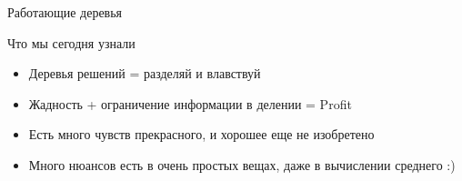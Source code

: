 \documentclass[14pt, fleqn, xcolor={dvipsnames, table}]{beamer}
\begin{document}
\begin{frame}{Работающие деревья}
\large
\center
{}
\end{frame}


\begin{frame}{Что мы сегодня узнали}
\begin{itemize}
  \item Деревья решений = разделяй и влавствуй
  \item Жадность + ограничение информации в делении = Profit
  \item Есть много чувств прекрасного, и хорошее еще не изобретено
  \item Много нюансов есть в очень простых вещах, даже в вычислении среднего :)
\end{itemize}
\end{frame}
\end{document}
